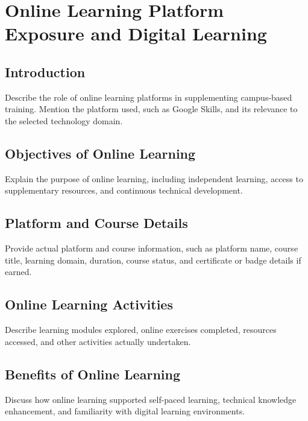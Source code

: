 \chapter{Online Learning Platform Exposure and Digital Learning}

\section{Introduction}
Describe the role of online learning platforms in supplementing campus-based training. Mention the platform used, such as Google Skills, and its relevance to the selected technology domain.

\section{Objectives of Online Learning}
Explain the purpose of online learning, including independent learning, access to supplementary resources, and continuous technical development.

\section{Platform and Course Details}
Provide actual platform and course information, such as platform name, course title, learning domain, duration, course status, and certificate or badge details if earned.

\section{Online Learning Activities}
Describe learning modules explored, online exercises completed, resources accessed, and other activities actually undertaken.

\section{Benefits of Online Learning}
Discuss how online learning supported self-paced learning, technical knowledge enhancement, and familiarity with digital learning environments.